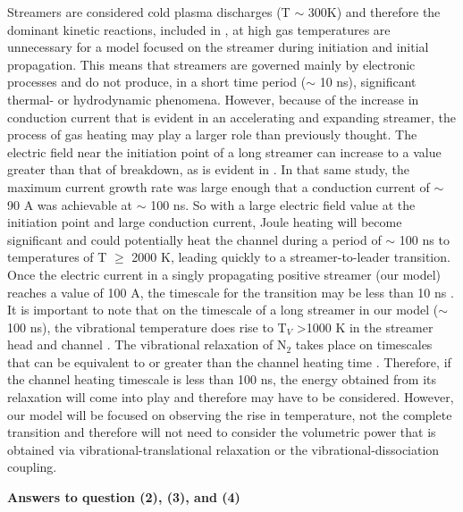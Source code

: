 \documentclass[]{article}
\begin{document}
	 Streamers are considered cold plasma discharges (T $\sim$ 300K) and therefore the dominant kinetic reactions, included in \citet{daSilva:2013a}, at high gas temperatures are unnecessary for a model focused on the streamer during initiation and initial propagation. This means that streamers are governed mainly by electronic processes and do not produce, in a short time period ($\sim$ 10 ns), significant thermal- or hydrodynamic phenomena. However, because of the increase in conduction current that is evident in an accelerating and expanding streamer, the process of gas heating may play a larger role than previously thought. The electric field near the initiation point of a long streamer can increase to a value greater than that of breakdown, as is evident in \citet{Shi:2016a}. In that same study, the maximum current growth rate was large enough that a conduction current of $\sim$ 90 A was achievable at $\sim$ 100 ns. So with a large electric field value at the initiation point and large conduction current, Joule heating will become significant and could potentially heat the channel during a period of $\sim$ 100 ns to temperatures of T $\geq$ 2000 K, leading quickly to a streamer-to-leader transition. Once the electric current in a singly propagating positive streamer (our model) reaches a value of 100 A, the timescale for the transition may be less than 10 ns \citep[Figure 15a]{daSilva:2013a}. 
	 It is important to note that on the timescale of a long streamer in our model ($\sim$ 100 ns), the vibrational temperature does rise to T$_V$ \textgreater 1000 K in the streamer head and channel \citep{Gallimberti:1979}. The vibrational relaxation of N$_2$ takes place on timescales that can be equivalent to or greater than the channel heating time \citep{Benilov:2003}. Therefore, if the channel heating timescale is less than 100 ns, the energy obtained from its relaxation will come into play and therefore may have to be considered. However, our model will be focused on observing the rise in temperature, not the complete transition and therefore will not need to consider the volumetric power that is obtained via vibrational-translational relaxation or the vibrational-dissociation coupling.
	 
	 \noindent \textbf{Answers to question (2), (3), and (4)}
	 
\end{document}
